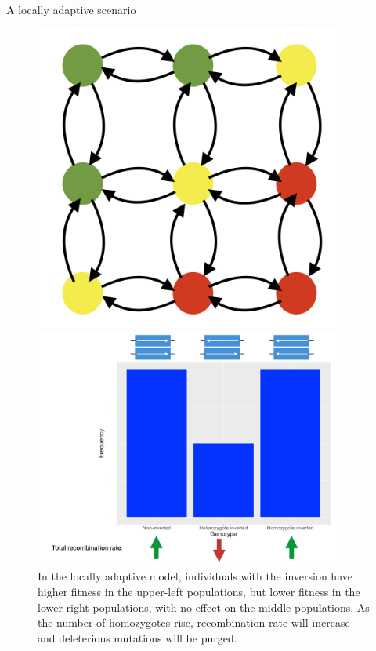 \documentclass[final]{beamer}
\newlength{\colwidth}
\begin{document}
\begin{frame}[t]
\begin{columns}[t]
\begin{column}{\colwidth}
\begin{block}{A locally adaptive scenario}
        \begin{figure}
          \begin{minipage}[c]{0.3\textwidth}
            \includegraphics[width=0.9\textwidth]{images/la_populations.png}
          \end{minipage}\hfill
          \begin{minipage}[c]{0.67\textwidth}
            \includegraphics[width=0.9\textwidth]{figures/la_theory.png}
          \end{minipage}\hfill
          \caption{
            In the locally adaptive model, individuals with the inversion have higher fitness in the upper-left populations, but lower fitness in the lower-right populations, with no effect on the middle populations. As the number of homozygotes rise, recombination rate will increase and deleterious mutations will be purged.
            }
        \end{figure}
        

\end{block}
\end{column}
\end{columns}
\end{frame}
\end{document}
